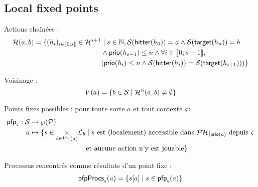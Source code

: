\subsection{Local fixed points}
Actions chaînées :
\begin{align*}
\mathcal{H}(a, b) = \{ (h_i)_{i \in \llbracket 0; s \rrbracket} \in \mathcal{H}^{s+1} &\mid s \in \mathbb{N}, \mathcal{S}(\mathsf{hitter}(h_0)) = a \wedge \mathcal{S}(\mathsf{target}(h_n)) = b \\
  & \wedge \mathsf{prio}(h_{s-1}) \leq n \wedge \forall i \in \llbracket 0; s-1 \rrbracket, \\
  & (\mathsf{prio}(h_i) \leq n \wedge \mathcal{S}(\mathsf{hitter}(h_i)) = \mathcal{S}(\mathsf{target}(h_{i+1}))) \}
\end{align*}

Voisinage :
$$
V(a) = \{ b \in \mathcal{S} \mid \mathcal{H}^n(a, b) \neq \emptyset \}
$$



Points fixes possibles : pour toute sorte $a$ et tout contexte $\varsigma$:
\begin{align*}
  \pfp_\ctx: \PHs &\rightarrow \wp(\PHproc) \\
  a &\mapsto \{ s \in \underset{b \in V^n(a)}{\times} \PHl_b \mid \text{$s$ est (localement) accessible dans $\restriction{\PH}{\prio(a)}$ depuis $\ctx$}\\
  &\qquad\qquad\qquad\qquad \text{et aucune action n'y est jouable} \}
\end{align*}

Processus rencontrés comme résultats d'un point fixe :
\begin{align*}
\mathsf{pfpProcs}_\varsigma(a) = \{ {s[a]} \mid s \in \mathsf{pfp}_\varsigma(a) \}
\end{align*}


